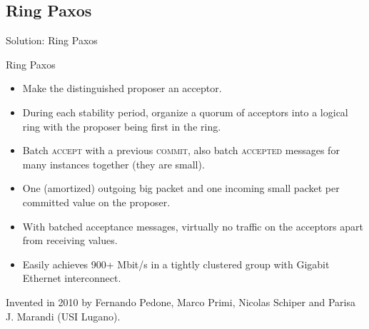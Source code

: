 \documentclass{beamer}
\begin{document}
\subsection{Ring Paxos}
\begin{frame}{Solution: Ring Paxos}
  \begin{figure}
  \centering
  \end{figure}
\end{frame}

\begin{frame}{Ring Paxos}
  \begin{itemize}
    \item Make the distinguished proposer an acceptor.
    \item During each stability period, organize a quorum of acceptors into a logical ring with the proposer being first in the ring.
    \item Batch \textsc{accept} with a previous \textsc{commit}, also batch \textsc{accepted} messages for many instances together (they are small).
    \item One (amortized) outgoing big packet and one incoming small packet per committed value on the proposer.
    \item With batched acceptance messages, virtually no traffic on the acceptors apart from receiving values.
    \item Easily achieves 900+ Mbit/s in a tightly clustered group with Gigabit Ethernet interconnect.
  \end{itemize}

  Invented in 2010 by Fernando Pedone, Marco Primi, Nicolas Schiper and Parisa J. Marandi (USI Lugano).
\end{frame}
\end{document}
